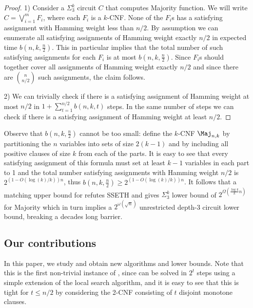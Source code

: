 \begin{proof}
1) Consider a $\Sigma^k_3$ circuit $C$ that computes Majority function.
We will write $C= \bigvee_{i = 1}^m F_i$, where each $F_i$ is a $k$-CNF. 
None of the $F_i$s has a satisfying assignment with Hamming 
weight less than $n/2$. 
By assumption we can enumerate all satisfying assignments of Hamming weight exactly $n/2$ in expected time $b(n, k, \frac{n}{2})$. 
This in particular implies that the total number of such 
satisfying assignments for each $F_i$ is at most $b(n, k, \frac{n}{2})$. 
Since $F_i$s should together cover all 
assignments of Hamming weight exactly 
$n/2$ and since there are $\binom{n}{n/2}$ such assignments, 
the claim follows.

2) We can trivially check if there is a satisfying assignment of Hamming weight at most $n/2$  in $1 + \sum_{t = 1}^{n/2}b(n, k, t)$ steps. In the same number of steps we can check if there is a satisfying assignment of Hamming weight at least $n/2$.
\end{proof}

Observe that $b(n, k, \frac{n}{2})$ cannot be too small: 
define the $k$-CNF $\Maj_{n, k}$ by partitioning the $n$ variables into 
sets of size $2(k - 1)$ and 
by including all positive clauses of size $k$
from each of the parts. It is easy to see that every satisfying assignment 
of this formula must set at least $k - 1$ variables in each 
part to 1 and the total number satisfying assignments with 
Hamming weight $n/2$ is $2^{(1 - O(\log(k)/k))n}$, 
thus $b(n, k, \frac{n}{2}) \ge 2^{(1 - O(\log(k)/k))n}$. It 
follows that a matching upper bound 
for  refutes SSETH and 
gives $\Sigma^k_3$ lower bound of $2^{\Omega(\frac{\log k}{k}n)}$ 
for Majority which in turn implies a $2^{\omega(\sqrt{n})}$ unrestricted depth-3 circuit lower bound, breaking a decades long barrier.


\subsection{Our contributions}

In this paper, we study  
and obtain new algorithms and lower bounds. Note that this is the first non-trivial instance of , since  can be solved in $2^t$ steps using a simple extension of the local search algorithm, and it is easy to see that this is tight for $t \le n/2$ by considering the 2-CNF consisting of $t$ disjoint monotone clauses.

